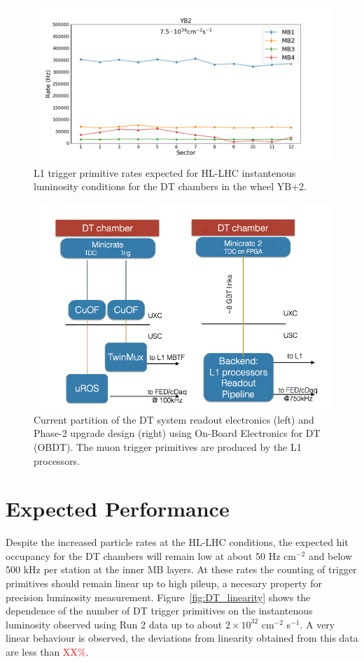 \begin{figure}[hbtp]
\centering
\includegraphics[width=.8\linewidth]{tex/Part2/fig/DT/DT-RatesExtrapolated.png}
\caption{L1 trigger primitive rates expected for HL-LHC instantenous luminosity conditions for the DT chambers in the wheel YB+2.} 
\label{fig:DT_rates}
\end{figure}

\begin{figure}[hbtp]
\centering
\includegraphics[width=.7\linewidth]{tex/Part2/fig/DT/DT-DAQ-Phase1_vs_Phase2.png}
\caption{Current partition of the DT system readout electronics (left) and Phase-2 upgrade design (right) using On-Board Electronics for DT (OBDT).
  The muon trigger primitives are produced by the L1 processors.
}   
\label{fig:DT_DAQ2}
\end{figure}


\clearpage

\section{Expected Performance}

Despite the increased particle rates at the HL-LHC conditions, the expected hit occupancy for the DT chambers will remain low at about 50 Hz cm$^{-2}$
and below 500 kHz per station at the inner MB layers.
At these rates the counting of trigger primitives should remain linear up to high pileup, a necesary property for precision luminosity measurement.
Figure~\ref{fig:DT_linearity} shows the dependence of the number of DT trigger primitives on the instantenous luminosity
observed using Run 2 data up to about $2\times10^{32}$ cm$^{-2}$ s$^{-1}$.
A very linear behaviour is observed, the deviations from linearity obtained from this data are less than \textcolor{red}{ XX\%}.

